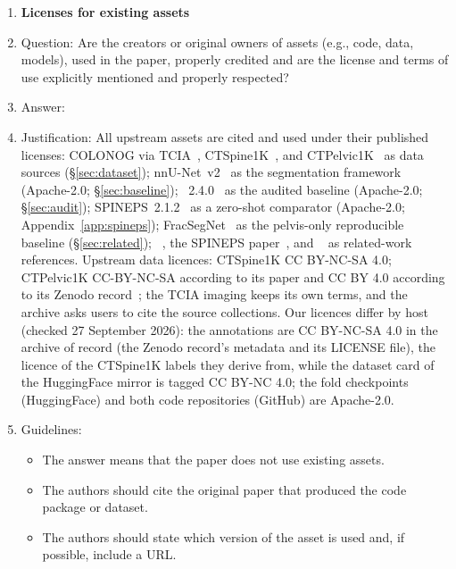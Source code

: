 \begin{enumerate}
\item {\bf Licenses for existing assets}
    \item[] Question: Are the creators or original owners of assets (e.g., code, data, models), used in the paper, properly credited and are the license and terms of use explicitly mentioned and properly respected?
    \item[] Answer: \answerYes{}
    \item[] Justification: All upstream assets are cited and used under their published licenses: COLONOG via TCIA~\citep{Smith2015DataCOLONOGRAPHY}, CTSpine1K~\citep{Deng2021CTSpine1K:Tomography}, and CTPelvic1K~\citep{Liu2021DeepModels} as data sources (\S\ref{sec:dataset}); nnU-Net~v2~\citep{Isensee2020NnU-Net:Segmentation,Isensee2024Nnu-netSegmentation} as the segmentation framework (Apache-2.0; \S\ref{sec:baseline}); \TS{}~2.4.0~\citep{Wasserthal2023TotalSegmentator:Images} as the audited baseline (Apache-2.0; \S\ref{sec:audit}); SPINEPS~2.1.2~\citep{MollerSPINEPSSoftware} as a zero-shot comparator (Apache-2.0; Appendix~\ref{app:spineps}); FracSegNet~\citep{Liu2025AutomaticDataset} as the pelvis-only reproducible baseline (\S\ref{sec:related}); \VERIDAH{}~\citep{Moller2026VERIDAH:Sequences}, the SPINEPS paper~\citep{Moller2024SPINEPSautomaticSegmentation}, and \VerSe{}~\citep{Sekuboyina2021VerSe:Images} as related-work references. Upstream data licences: CTSpine1K CC BY-NC-SA 4.0; CTPelvic1K CC-BY-NC-SA according to its paper and CC BY 4.0 according to its Zenodo record~\citep{Liu2020CTPelvic1KData}; the TCIA imaging keeps its own terms, and the archive asks users to cite the source collections. Our licences differ by host (checked 27 September 2026): the \dataset{} annotations are CC BY-NC-SA 4.0 in the archive of record (the Zenodo record's metadata and its LICENSE file), the licence of the CTSpine1K labels they derive from, while the dataset card of the HuggingFace mirror is tagged CC BY-NC 4.0; the fold checkpoints (HuggingFace) and both code repositories (GitHub) are Apache-2.0.
    \item[] Guidelines:
    \begin{itemize}
        \item The answer \answerNA{} means that the paper does not use existing assets.
        \item The authors should cite the original paper that produced the code package or dataset.
        \item The authors should state which version of the asset is used and, if possible, include a URL.

\end{itemize}
\end{enumerate}
